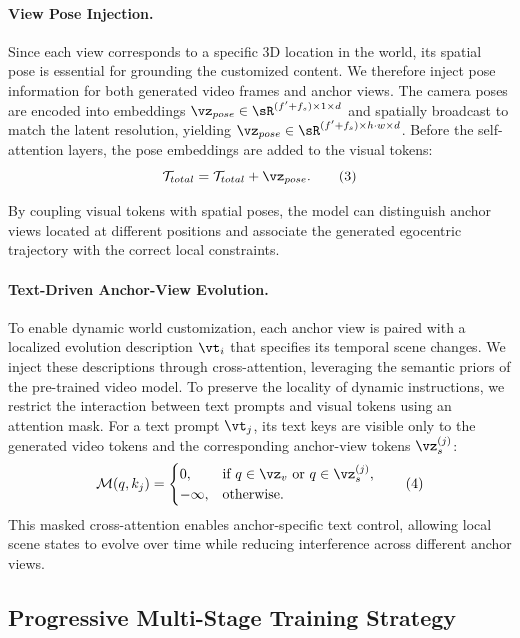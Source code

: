 


\paragraph{View Pose Injection.}
Since each view corresponds to a specific 3D location in the world, its spatial pose is essential for grounding the customized content. 
We therefore inject pose information for both generated video frames and anchor views. 
The camera poses are encoded into embeddings $\vz_{pose} \in \sR^{(f' + f_s) \times 1 \times d}$ and spatially broadcast to match the latent resolution, yielding $\vz_{pose} \in \sR^{(f' + f_s) \times h \cdot w \times d}$. 
Before the self-attention layers, the pose embeddings are added to the visual tokens:
\[
    \mathcal{T}_{total} = \mathcal{T}_{total} + \vz_{pose}. \tag{3}
\]

By coupling visual tokens with spatial poses, the model can distinguish anchor views located at different positions and associate the generated egocentric trajectory with the correct local constraints. 

\paragraph{Text-Driven Anchor-View Evolution.}
To enable dynamic world customization, each anchor view is paired with a localized evolution description $\vt_i$ that specifies its temporal scene changes.
We inject these descriptions through cross-attention, leveraging the semantic priors of the pre-trained video model.
To preserve the locality of dynamic instructions, we restrict the interaction between text prompts and visual tokens using an attention mask. 
For a text prompt $\vt_j$, its text keys are visible only to the generated video tokens and the corresponding anchor-view tokens $\vz_s^{(j)}$:
\[
    \mathcal{M}(q, k_j) = 
    \begin{cases} 
    0, & \text{if } q \in \vz_v \text{ or } q \in \vz_s^{(j)}, \\
    -\infty, & \text{otherwise}.
    \end{cases} \tag{4}
\]
This masked cross-attention enables anchor-specific text control, allowing local scene states to evolve over time while reducing interference across different anchor views.

\subsection{Progressive Multi-Stage Training Strategy}\label{sec:3.3}

